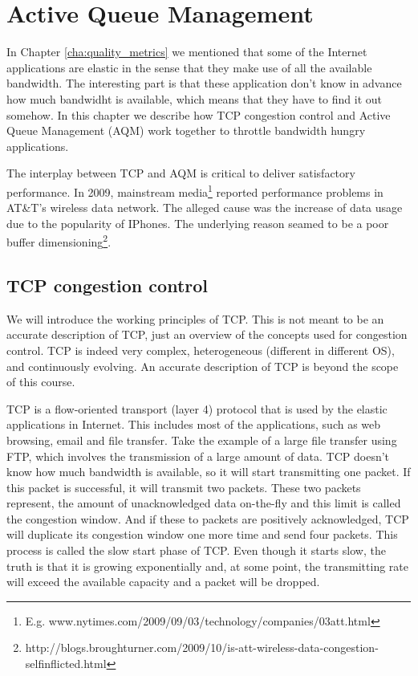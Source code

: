 \chapter{Active Queue Management}

In Chapter \ref{cha:quality_metrics} we mentioned that some of the Internet applications are elastic in the sense that they make use of all the available bandwidth.
The interesting part is that these application don't know in advance how much bandwidht is available, which means that they have to find it out somehow.
In this chapter we describe how TCP congestion control and Active Queue Management (AQM) work together to throttle bandwidth hungry applications.

The interplay between TCP and AQM is critical to deliver satisfactory performance.
In 2009, mainstream media\footnote{E.g. www.nytimes.com/2009/09/03/technology/companies/03att.html} reported performance problems in AT\&T's wireless data network.
The alleged cause was the increase of data usage due to the popularity of IPhones.
The underlying reason seamed to be a poor buffer dimensioning\footnote{http://blogs.broughturner.com/2009/10/is-att-wireless-data-congestion-selfinflicted.html}.

\section{TCP congestion control}
We will introduce the working principles of TCP.
This is not meant to be an accurate description of TCP, just an overview of the concepts used for congestion control.
TCP is indeed very complex, heterogeneous (different in different OS), and continuously evolving.
An accurate description of TCP is beyond the scope of this course.

TCP is a flow-oriented transport (layer 4) protocol that is used by the elastic applications in Internet.
This includes most of the applications, such as web browsing, email and file transfer.
Take the example of a large file transfer using FTP, which involves the transmission of a large amount of data.
TCP doesn't know how much bandwidth is available, so it will start transmitting one packet.
If this packet is successful, it will transmit two packets.
These two packets represent, the amount of unacknowledged data on-the-fly and this limit is called the congestion window.
And if these to packets are positively acknowledged, TCP will duplicate its congestion window one more time and send four packets.
This process is called the slow start phase of TCP.
Even though it starts slow, the truth is that it is growing exponentially and, at some point, the transmitting rate will exceed the available capacity and a packet will be dropped.

